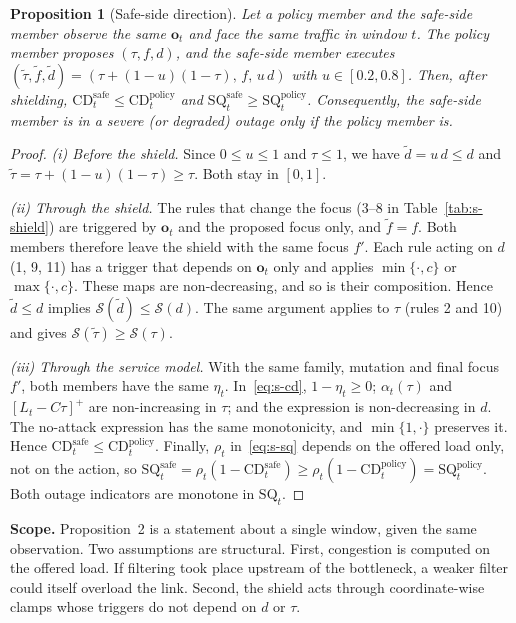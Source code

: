 \documentclass[10pt,journal,onecolumn]{IEEEtran}
\newtheorem{proposition}{Proposition}
\begin{document}
\begin{proposition}[Safe-side direction]
Let a policy member and the safe-side member observe the same $\mathbf{o}_t$ and face the same traffic in window $t$. The policy member proposes $(\tau,f,d)$, and the safe-side member executes $(\tilde\tau,\tilde f,\tilde d)=(\tau+(1-u)(1-\tau),\,f,\,u\,d)$ with $u\in[0.2,0.8]$. Then, after shielding, $\mathrm{CD}_t^{\mathrm{safe}}\le\mathrm{CD}_t^{\mathrm{policy}}$ and $\mathrm{SQ}_t^{\mathrm{safe}}\ge\mathrm{SQ}_t^{\mathrm{policy}}$. Consequently, the safe-side member is in a severe (or degraded) outage only if the policy member is.
\end{proposition}
\begin{proof}
\emph{(i) Before the shield.} Since $0\le u\le1$ and $\tau\le1$, we have $\tilde d=u\,d\le d$ and $\tilde\tau=\tau+(1-u)(1-\tau)\ge\tau$. Both stay in $[0,1]$.

\emph{(ii) Through the shield.} The rules that change the focus (3--8 in Table~\ref{tab:s-shield}) are triggered by $\mathbf{o}_t$ and the proposed focus only, and $\tilde f=f$. Both members therefore leave the shield with the same focus $f'$. Each rule acting on $d$ (1, 9, 11) has a trigger that depends on $\mathbf{o}_t$ only and applies $\min\{\cdot,c\}$ or $\max\{\cdot,c\}$. These maps are non-decreasing, and so is their composition. Hence $\tilde d\le d$ implies $\mathcal{S}(\tilde d)\le\mathcal{S}(d)$. The same argument applies to $\tau$ (rules 2 and 10) and gives $\mathcal{S}(\tilde\tau)\ge\mathcal{S}(\tau)$.

\emph{(iii) Through the service model.} With the same family, mutation and final focus $f'$, both members have the same $\eta_t$. In~\eqref{eq:s-cd}, $1-\eta_t\ge0$; $\alpha_t(\tau)$ and $[L_t-C\tau]^+$ are non-increasing in $\tau$; and the expression is non-decreasing in $d$. The no-attack expression has the same monotonicity, and $\min\{1,\cdot\}$ preserves it. Hence $\mathrm{CD}_t^{\mathrm{safe}}\le\mathrm{CD}_t^{\mathrm{policy}}$. Finally, $\rho_t$ in~\eqref{eq:s-sq} depends on the offered load only, not on the action, so $\mathrm{SQ}_t^{\mathrm{safe}}=\rho_t(1-\mathrm{CD}_t^{\mathrm{safe}})\ge\rho_t(1-\mathrm{CD}_t^{\mathrm{policy}})=\mathrm{SQ}_t^{\mathrm{policy}}$. Both outage indicators are monotone in $\mathrm{SQ}_t$.
\end{proof}

\textbf{Scope.} Proposition~2 is a statement about a single window, given the same observation. Two assumptions are structural. First, congestion is computed on the offered load. If filtering took place upstream of the bottleneck, a weaker filter could itself overload the link. Second, the shield acts through coordinate-wise clamps whose triggers do not depend on $d$ or $\tau$.
\end{document}
